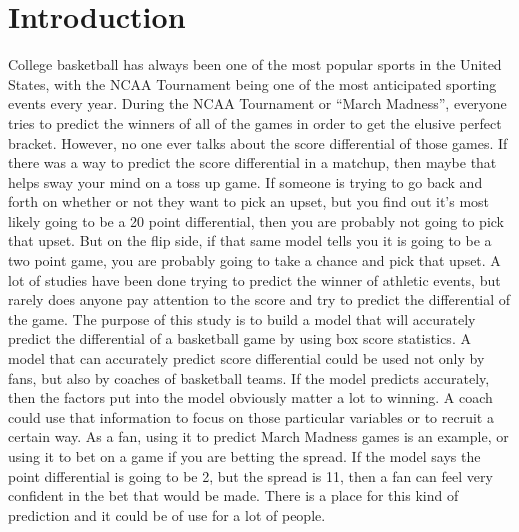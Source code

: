 \documentclass{article}
\begin{document}
\section{Introduction}
College basketball has always been one of the most popular sports in the United States, with the NCAA Tournament being one of the most anticipated sporting events every year. During the NCAA Tournament or “March Madness”, everyone tries to predict the winners of all of the games in order to get the elusive perfect bracket. However, no one ever talks about the score differential of those games. If there was a way to predict the score differential in a matchup, then maybe that helps sway your mind on a toss up game. If someone is trying to go back and forth on whether or not they want to pick an upset, but you find out it's most likely going to be a 20 point differential, then you are probably not going to pick that upset. But on the flip side, if that same model tells you it is going to be a two point game, you are probably going to take a chance and pick that upset. 
\newline \indent A lot of studies have been done trying to predict the winner of athletic events, but rarely does anyone pay attention to the score and try to predict the differential of the game. The purpose of this study is to build a model that will accurately predict the differential of a basketball game by using box score statistics. A model that can accurately predict score differential could be used not only by fans, but also by coaches of basketball teams. If the model predicts accurately, then the factors put into the model obviously matter a lot to winning. A coach could use that information to focus on those particular variables or to recruit a certain way. As a fan, using it to predict March Madness games is an example, or using it to bet on a game if you are betting the spread. If the model says the point differential is going to be 2, but the spread is 11, then a fan can feel very confident in the bet that would be made. There is a place for this kind of prediction and it could be of use for a lot of people.
\end{document}
